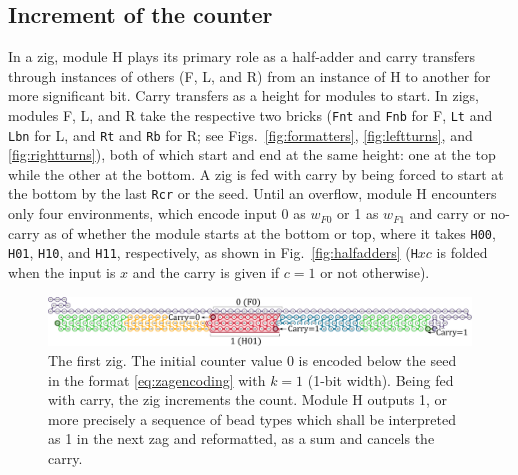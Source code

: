 \documentclass[twocolumn]{svjour3}
\begin{document}
\subsection{Increment of the counter}
In a zig, module H plays its primary role as a half-adder and carry transfers through instances of others (F, L, and R) from an instance of H to another for more significant bit.
Carry transfers as a height for modules to start.
In zigs, modules F, L, and R take the respective two bricks (\texttt{Fnt} and \texttt{Fnb} for F, \texttt{Lt} and \texttt{Lbn} for L, and \texttt{Rt} and \texttt{Rb} for R; see Figs.~\ref{fig:formatters}, \ref{fig:leftturns}, and \ref{fig:rightturns}), both of which start and end at the same height: one at the top while the other at the bottom.
A zig is fed with carry by being forced to start at the bottom by the last \texttt{Rcr} or the seed.
Until an overflow, module H encounters only four environments, which encode input 0 as $w_{F0}$ or 1 as $w_{F1}$ and carry or no-carry as of whether the module starts at the bottom or top, where it takes \texttt{H00}, \texttt{H01}, \texttt{H10}, and \texttt{H11}, respectively, as shown in Fig.~\ref{fig:halfadders} (\texttt{H}$xc$ is folded when the input is $x$ and the carry is given if $c=1$ or not otherwise).

\begin{figure}[tb]
\centering
\includegraphics[width=0.9\linewidth]{CounterEx5_1.pdf}
\caption{
The first zig.
The initial counter value 0 is encoded below the seed in the format \eqref{eq:zagencoding} with $k = 1$ (1-bit width).
Being fed with carry, the zig increments the count.
Module H outputs 1, or more precisely a sequence of bead types which shall be interpreted as 1 in the next zag and reformatted, as a sum and cancels the carry.
}

\label{fig:counter1stzig}
\end{figure}
\end{document}
